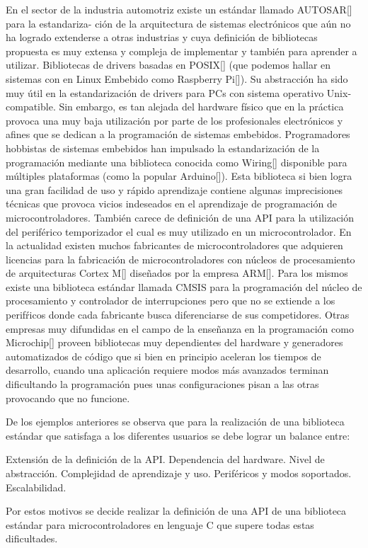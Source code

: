 En el sector de la industria automotriz existe un estándar llamado AUTOSAR[] para la estandariza- ción de la  arquitectura de sistemas electrónicos que aún no ha logrado extenderse a otras industrias y cuya definición de bibliotecas propuesta es muy extensa y compleja de implementar y también para aprender a utilizar.
Bibliotecas de drivers basadas en POSIX[] (que podemos hallar en sistemas con en Linux Embebido como Raspberry Pi[]). Su abstracción ha sido muy útil en la estandarización de drivers para PCs con sistema operativo Unix-compatible. Sin embargo, es tan alejada del hardware físico que en la práctica provoca una muy baja utilización por parte de los profesionales electrónicos y afines que se dedican a la programación de sistemas embebidos.
Programadores hobbistas de sistemas embebidos han impulsado la  estandarización de la programación mediante una biblioteca conocida como Wiring[] disponible para múltiples plataformas (como la popular Arduino[]). Esta biblioteca si bien logra una gran facilidad de uso y rápido aprendizaje contiene algunas imprecisiones técnicas que provoca vicios indeseados en el aprendizaje de programación de microcontroladores. También carece de definición de una API para la utilización del periférico temporizador el cual es muy utilizado en un microcontrolador.
En la actualidad existen muchos fabricantes de microcontroladores que adquieren licencias para la fabricación de microcontroladores con núcleos de procesamiento de arquitecturas Cortex M[] diseñados por la empresa ARM[]. Para los mismos existe una biblioteca estándar llamada CMSIS{} para la programación del núcleo de procesamiento y controlador de interrupciones pero que no se extiende a los perifŕicos donde cada fabricante busca diferenciarse de sus competidores.
Otras empresas muy difundidas en el campo de la enseñanza en la programación como Microchip[] proveen bibliotecas muy dependientes del hardware y generadores automatizados de código que si bien en principio aceleran los tiempos de desarrollo, cuando una aplicación requiere modos más avanzados terminan dificultando la programación pues unas configuraciones pisan a las otras provocando que no funcione.

De los ejemplos anteriores se observa que para la realización de una biblioteca estándar que satisfaga a los diferentes usuarios se debe lograr un balance entre:

Extensión de la definición de la API.
Dependencia del hardware.
Nivel de abstracción.
Complejidad de aprendizaje y uso.
Periféricos y modos soportados.
Escalabilidad.

Por estos motivos se decide realizar la definición de una API de una biblioteca estándar para microcontroladores  en lenguaje C que supere todas estas dificultades.
